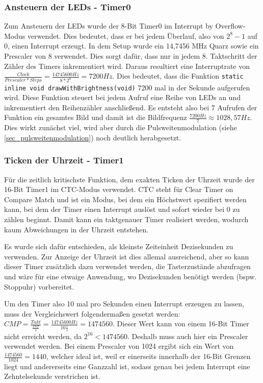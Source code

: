 \subsubsection{Ansteuern der LEDs - Timer0}
Zum Ansteuern der LEDs wurde der 8-Bit Timer0 im \glqq Interrupt by Overflow\grqq -Modus verwendet. Dies bedeutet, dass er bei jedem Überlauf, also von $2^8-1$ auf $0$, einen Interrupt erzeugt. In dem Setup wurde ein 14,7456 MHz Quarz sowie ein Prescaler von 8 verwendet. Dies sorgt dafür, dass nur in jedem 8. Taktschritt der Zähler des Timers inkrementiert wird. Daraus resultiert eine Interruptrate von $\frac{Clock}{Prescaler * Steps} = \frac{14745600 Hz}{8 * 2^8} = 7200 Hz$. Dies bedeutet, dass die Funktion \texttt{static inline void drawWithBrightness(void)} 7200 mal in der Sekunde aufgerufen wird. Diese Funktion steuert bei jedem Aufruf eine Reihe von LEDs an und inkrementiert den Reihenzähler anschließend. Es entsteht also bei 7 Aufrufen der Funktion ein gesamtes Bild und damit ist die Bildfrequenz $\frac{7200 Hz}{7} \approx 1028,57 Hz$. Dies wirkt zunächst viel, wird aber durch die Pulsweitenmodulation (siehe \ref{sec_pulsweitenmodulation}) noch deutlich herabgesetzt.

\subsubsection{Ticken der Uhrzeit - Timer1}
Für die zeitlich kritischste Funktion, dem exakten Ticken der Uhrzeit wurde der 16-Bit Timer1 im \glqq CTC\grqq -Modus verwendet. CTC steht für Clear Timer on Compare Match und ist ein Modus, bei dem ein Höchstwert spezifiert werden kann, bei dem der Timer einen Interrupt auslöst und sofort wieder bei 0 zu zählen beginnt. Damit kann ein taktgenauer Timer realisiert werden, wodurch kaum Abweichungen in der Uhrzeit entstehen.

Es wurde sich dafür entschieden, als kleinste Zeiteinheit Dezisekunden zu verwenden. Zur Anzeige der Uhrzeit ist dies allemal ausreichend, aber so kann dieser Timer zusätzlich dazu verwendet werden, die Tasterzustände abzufragen und wäre für eine etwaige Anwendung, wo Dezisekunden benötigt werden (bspw. Stoppuhr) vorbereitet.

Um den Timer also 10 mal pro Sekunden einen Interrupt erzeugen zu lassen, muss der Vergleichswert folgendermaßen gesetzt werden: $CMP = \frac{Takt}{\frac{INT}{s}} = \frac{14745600 Hz}{10 \frac{1}{s}} = 1474560$. Dieser Wert kann von einem 16-Bit Timer nicht erreicht werden, da $2^{16} < 1474560$. Deshalb muss auch hier ein Prescaler verwendet werden. Bei einem Prescaler von 1024 ergibt sich ein Wert von $\frac{1474560}{1024} = 1440$, welcher ideal ist, weil er einerseits innerhalb der 16-Bit Grenzen liegt und andererseits eine Ganzzahl ist, sodass genau bei jedem Interrupt eine Zehntelsekunde verstrichen ist.

